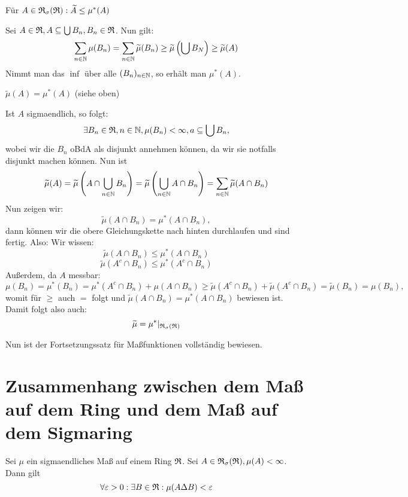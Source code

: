 			\begin{satz}
				Für $A\in\mathfrak{R}_\sigma(\mathfrak{R}): \widetilde{A}\le \mu^*(A)$
			\end{satz}
			
			\begin{bew}
				Sei $A\in\mathfrak{R}, A\subseteq \bigcup B_n, B_n\in\mathfrak{R}$. Nun gilt:
				\[ \sum_{n\in\mathbb{N}}\mu(B_n)=\sum_{n\in\mathbb{N}} \widetilde{\mu}(B_n)\ge \widetilde{\mu}\left(\bigcup B_N\right)\ge \widetilde{\mu}(A) \]
				Nimmt man das $\inf$ über alle $(B_n)_{n\in\mathbb{N}}$, so erhält man $\mu^*(A)$.
			\end{bew}
			
			\begin{satz}
				$\widetilde{\mu}(A)=\mu^*(A)$ (siehe oben)
			\end{satz}
			
			\begin{bew}
				Ist $A$ sigmaendlich, so folgt:
				\[ \exists B_n\in\mathfrak{R}, n\in\mathbb{N}, \mu(B_n)<\infty, a\subseteq \bigcup B_n, \]
				wobei wir die $B_n$ oBdA als disjunkt annehmen können, da wir sie notfalls disjunkt machen können.\newline
				Nun ist
				\[ \widetilde{\mu}(A)=\widetilde{\mu}\left(A\cap\bigcup_{n\in\mathbb{N}}B_n\right)=\widetilde{\mu}\left(\bigcup_{n\in\mathbb{N}}A\cap B_n\right)=\sum_{n\in\mathbb{N}} \widetilde{\mu}(A\cap B_n) \]
				Nun zeigen wir:
				\[ \widetilde{\mu}(A\cap B_n)=\mu^*(A\cap B_n), \]
				dann können wir die obere Gleichungskette nach hinten durchlaufen und sind fertig.\newline
				Also: Wir wissen: 
				\[ \widetilde{\mu}(A\cap B_n)\le \mu^*(A\cap B_n) \]
				\[ \widetilde{\mu}(A^c\cap B_n)\le\mu^*(A^c\cap B_n) \]
				Außerdem, da $A$ messbar:
				\[ \mu(B_n)=\mu^*(B_n)=\mu^*(A^c\cap B_n)+\mu(A\cap B_n)\ge \widetilde{\mu}(A^c\cap B_n)+\widetilde{\mu}(A^c\cap B_n)=\widetilde{\mu}(B_n)=\mu(B_n), \]
				womit für $\ge$ auch $=$ folgt und $\widetilde{\mu}(A\cap B_n)=\mu^*(A\cap B_n)$ bewiesen ist. Damit folgt also auch:\[ \widetilde{\mu}=\mu^*|_{\mathfrak{R}_\sigma(\mathfrak{R})} \]
			\end{bew}
			
			\begin{bem}
				Nun ist der Fortsetzungssatz für Maßfunktionen vollständig bewiesen.
			\end{bem}
			
			\section{Zusammenhang zwischen dem Maß auf dem Ring und dem Maß auf dem Sigmaring}
			\begin{satz} [Approximationstheorem I]
				Sei $\mu$ ein sigmaendliches Maß auf einem Ring $\mathfrak{R}$. Sei $A\in\mathfrak{R}_\sigma(\mathfrak{R}), \mu(A)<\infty$. Dann gilt
				\[ \forall \varepsilon>0: \exists B\in\mathfrak{R}: \mu(A\Delta B)<\varepsilon \]
			\end{satz}
			
